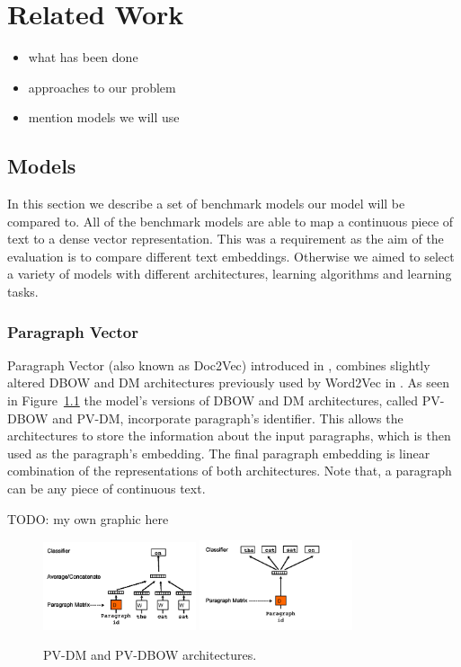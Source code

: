 \chapter{Related Work}

\begin{itemize}
    \item what has been done
    \item approaches to our problem
    \item mention models we will use
\end{itemize}

\section{Models}

In this section we describe a set of benchmark models our model will be compared
to. All of the benchmark models are able to map a continuous piece of text to a
dense vector representation. This was a requirement as the aim of the evaluation
is to compare different text embeddings. Otherwise we aimed to select a variety
of models with different architectures, learning algorithms and learning tasks.

\subsection{Paragraph Vector}

Paragraph Vector (also known as Doc2Vec) introduced in \cite{le2014distributed},
combines slightly altered DBOW and DM architectures previously used by Word2Vec
in \cite{mikolov2013efficient}. As seen in Figure~\ref{fig:pv-dm_pv-dbow} the
model's versions of DBOW and DM architectures, called PV-DBOW and PV-DM,
incorporate paragraph's identifier. This allows the architectures to store the
information about the input paragraphs, which is then used as the paragraph's
embedding. The final paragraph embedding is linear combination of the
representations of both architectures. Note that, a paragraph can be any piece
of continuous text.

TODO: my own graphic here

\begin{figure}[h]
    \centering
    \includegraphics[width=0.4\textwidth]{./img/pv-dm.png}
    \includegraphics[width=0.4\textwidth]{./img/pv-dbow.png}
    \caption{PV-DM and PV-DBOW architectures.\label{fig:pv-dm_pv-dbow}}
\end{figure}

